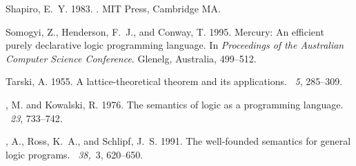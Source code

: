 \documentclass{tlp}
\begin{document}
\begin{thebibliography}{}
{\sc Shapiro, E.~Y.} 1983.
.
\newblock MIT Press, Cambridge MA.

{\sc Somogyi, Z.}, {\sc Henderson, F.~J.}, {\sc and} {\sc Conway, T.} 1995.
\newblock Mercury: An efficient purely declarative logic programming language.
\newblock In {\em Proceedings of the {Australian} Computer Science Conference}.
  Glenelg, Australia, 499--512.

{\sc Tarski, A.} 1955.
\newblock A lattice-theoretical theorem and its applications.
~{\em 5}, 285--309.

{, M.} {\sc and} {\sc Kowalski, R.} 1976.
\newblock The semantics of logic as a programming language.
~{\em 23}, 733--742.

{, A.}, {\sc Ross, K.~A.}, {\sc and} {\sc Schlipf, J.~S.} 1991.
\newblock The well-founded semantics for general logic programs.
~{\em 38,\/}~3, 620--650.

\end{thebibliography}
\end{document}
